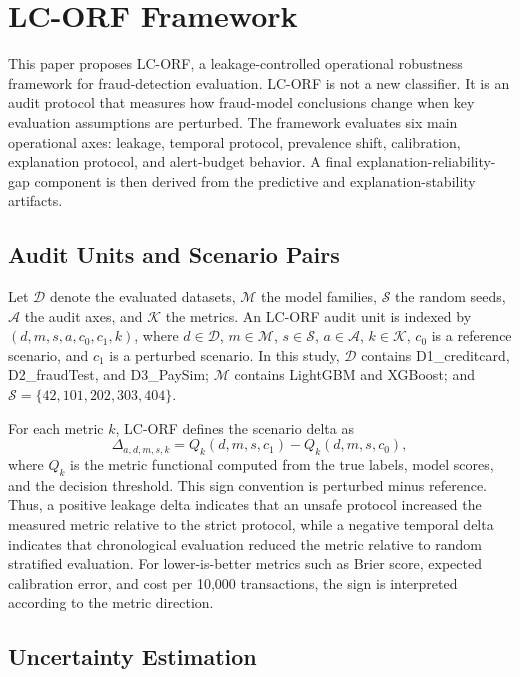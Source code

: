 \section{LC-ORF Framework}
\label{sec:lcorf}

This paper proposes LC-ORF, a leakage-controlled operational robustness framework for fraud-detection evaluation. LC-ORF is not a new classifier. It is an audit protocol that measures how fraud-model conclusions change when key evaluation assumptions are perturbed. The framework evaluates six main operational axes: leakage, temporal protocol, prevalence shift, calibration, explanation protocol, and alert-budget behavior. A final explanation-reliability-gap component is then derived from the predictive and explanation-stability artifacts.

\subsection{Audit Units and Scenario Pairs}

Let $\mathcal{D}$ denote the evaluated datasets, $\mathcal{M}$ the model families, $\mathcal{S}$ the random seeds, $\mathcal{A}$ the audit axes, and $\mathcal{K}$ the metrics. An LC-ORF audit unit is indexed by $(d,m,s,a,c_0,c_1,k)$, where $d \in \mathcal{D}$, $m \in \mathcal{M}$, $s \in \mathcal{S}$, $a \in \mathcal{A}$, $k \in \mathcal{K}$, $c_0$ is a reference scenario, and $c_1$ is a perturbed scenario. In this study, $\mathcal{D}$ contains D1\_creditcard, D2\_fraudTest, and D3\_PaySim; $\mathcal{M}$ contains LightGBM and XGBoost; and $\mathcal{S}=\{42,101,202,303,404\}$.

For each metric $k$, LC-ORF defines the scenario delta as
\begin{equation}
\Delta_{a,d,m,s,k}
= Q_k(d,m,s,c_1) - Q_k(d,m,s,c_0),
\label{eq:lcorf-delta}
\end{equation}
where $Q_k$ is the metric functional computed from the true labels, model scores, and the decision threshold. This sign convention is perturbed minus reference. Thus, a positive leakage delta indicates that an unsafe protocol increased the measured metric relative to the strict protocol, while a negative temporal delta indicates that chronological evaluation reduced the metric relative to random stratified evaluation. For lower-is-better metrics such as Brier score, expected calibration error, and cost per 10,000 transactions, the sign is interpreted according to the metric direction.

\subsection{Uncertainty Estimation}

